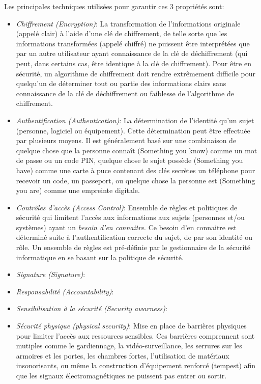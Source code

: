 Les principales techniques utilis\'ees pour garantir ces 3 propri\'et\'es sont:
\begin{itemize}
\setlength\itemsep{1em}
\item \emph{Chiffrement (Encryption)}: La transformation de l'informations originale (appel\'e clair) \`a l'aide d'une cl\'e de chiffrement, de telle sorte que les informations transform\'ees (appel\'e chiffr\'e) ne puissent \^etre interpr\'et\'ees que par un autre utilisateur ayant connaissance de la cl\'e de d\'echiffrement (qui peut, dans certains cas, \^etre identique \`a la cl\'e de chiffrement). Pour \^etre en s\'ecurit\'e, un algorithme de chiffrement doit rendre extr\^emement difficile pour quelqu'un de d\'eterminer tout ou partie des informations clairs sans connaissance de la cl\'e de d\'echiffrement ou faiblesse de l'algorithme de chiffrement.

\item \emph{Authentification (Authentication)}: La d\'etermination de l'identit\'e qu'un sujet (personne, logiciel ou \'equipement). Cette d\'etermination peut \^etre effectu\'ee par plusieurs moyens. Il est g\'en\'eralement bas\'e sur une combinaison de quelque chose que la personne conna\^it (Something you know) comme un mot de passe ou un code PIN, quelque chose le sujet poss\`ede (Something you have) comme une carte \`a puce contenant des cl\'es secr\`etes un t\'el\'ephone pour recevoir un code, un passeport, ou quelque chose la personne est (Something you are) comme une empreinte digitale.

\item \emph{Contr\^oles d'acc\`es (Access Control)}: Ensemble de r\`egles et politiques de s\'ecurit\'e qui limitent l'acc\`es aux informations aux sujets (personnes et/ou syst\`emes) ayant un \emph{besoin d'en connaitre}. Ce besoin d'en connaitre est d\'etermin\'e suite \`a l'authentification correcte du sujet, de par son identit\'e ou r\^ole. Un ensemble de r\`egles est pr\'e-d\'efinie par le gestionnaire de la s\'ecurit\'e informatique en se basant sur la politique de s\'ecurit\'e.

\item \emph{Signature (Signature)}: 

\item \emph{Responsabilit\'e (Accountability)}: 

\item \emph{Sensibilisation \`a la s\'ecurit\'e (Security awarness)}:



\item \emph{S\'ecurit\'e physique (physical security)}: Mise en place de barri\`eres physiques pour limiter l'acc\`es aux ressources sensibles. Ces barrières comprennent sont mutiples comme le gardiennage, la vid\'eo-surveillance, les serrures sur les armoires et les portes, les chambres fortes, l'utilisation de matériaux insonorisants, ou m\^eme la construction d'\'equipement renforc\'e (tempest) afin que les signaux \'electromagn\'etiques ne puissent pas entrer ou sortir.


\end{itemize}
